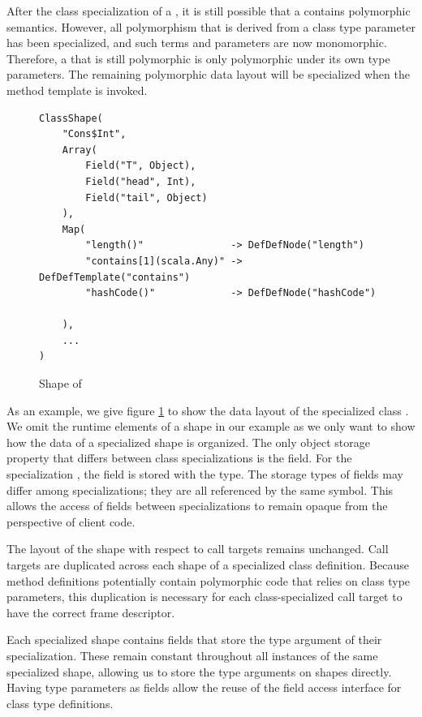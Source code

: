 After the class specialization of a , it is still possible that a  contains polymorphic semantics.
However, all polymorphism that is derived from a class type parameter has been specialized, and such terms and parameters are now monomorphic.
Therefore, a  that is still polymorphic is only polymorphic under its own type parameters.
The remaining polymorphic data layout will be specialized when the method template is invoked.

\begin{figure}[!htb]
\begin{verbatim}
ClassShape(
	"Cons$Int",
	Array(
		Field("T", Object),
		Field("head", Int),
		Field("tail", Object)
	),
	Map(
		"length()"               -> DefDefNode("length")
		"contains[1](scala.Any)" -> DefDefTemplate("contains")
		"hashCode()"             -> DefDefNode("hashCode")
	
	),
	...
)
\end{verbatim}
\caption{Shape of }
\label{shape:cons-int}
\end{figure}

As an example, we give figure \ref{shape:cons-int} to show the data layout of the specialized class .
We omit the runtime elements of a shape in our example as we only want to show how the data of a specialized shape is organized.
The only object storage property that differs between class specializations is the  field.
For the specialization , the  field is stored with the  type.
The storage types of fields may differ among specializations; they are all referenced by the same symbol.
This allows the access of fields between specializations to remain opaque from the perspective of client code.

The layout of the shape with respect to call targets remains unchanged.
Call targets are duplicated across each shape of a specialized class definition.
Because method definitions potentially contain polymorphic code that relies on class type parameters, this duplication is necessary for each class-specialized call target to have the correct frame descriptor.

Each specialized shape contains fields that store the type argument of their specialization.
These remain constant throughout all instances of the same specialized shape, allowing us to store the type arguments on shapes directly.
Having type parameters as fields allow the reuse of the field access interface for class type definitions.

